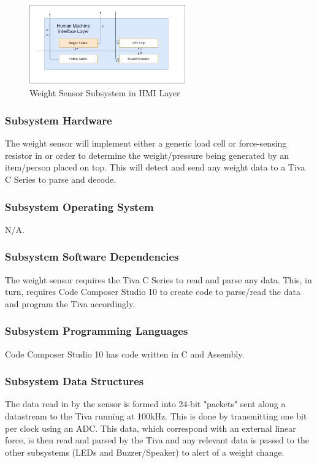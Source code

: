 \begin{figure}[h!]
	\centering
 	\includegraphics[width=0.60\textwidth]{images/Kendall/Weight Sensor.png}
 \caption{Weight Sensor Subsystem in HMI Layer}
\end{figure}

\subsubsection{Subsystem Hardware}
The weight sensor will implement either a generic load cell or force-sensing resistor in or order to determine the weight/pressure being generated by an item/person placed on top. This will detect and send any weight data to a Tiva C Series to parse and decode.

\subsubsection{Subsystem Operating System}
N/A.

\subsubsection{Subsystem Software Dependencies}
The weight sensor requires the Tiva C Series to read and parse any data. This, in turn, requires Code Composer Studio 10 to create code to parse/read the data and program the Tiva accordingly.

\subsubsection{Subsystem Programming Languages}
Code Composer Studio 10 has code written in C and Assembly.

\subsubsection{Subsystem Data Structures}
The data read in by the sensor is formed into 24-bit "packets" sent along a datastream to the Tiva running at 100kHz. This is done by transmitting one bit per clock using an ADC. This data, which correspond with an external linear force, is then read and parsed by the Tiva and any relevant data is passed to the other subsystems (LEDs and Buzzer/Speaker) to alert of a weight change.

